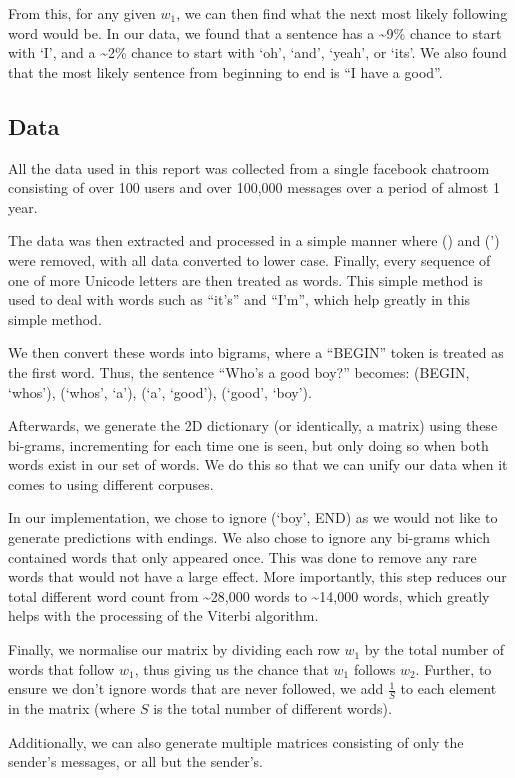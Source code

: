 \documentclass{article}
\begin{document}
From this, for any given $w_1$, we can then find what the next most likely
following word would be. In our data, we found that a sentence has a \sim9\%
chance to start with `I', and a \sim2\% chance to start with `oh', `and',
`yeah', or `its'. We also found that the most likely sentence from beginning to
end is ``I have a good''.

\subsection{Data}
All the data used in this report was collected from a single facebook chatroom
consisting of over 100 users and over 100,000 messages over a period of almost
1 year.

The data was then extracted and processed in a simple manner where
(\textsc{}) and (\textsc{'}) were removed, with all data converted to
lower case. Finally, every sequence of one of more Unicode letters are then
treated as words. This simple method is used to deal with words such as
``it's'' and ``I'm'', which help greatly in this simple method.

We then convert these words into bigrams, where a ``BEGIN'' token is treated as
the first word. Thus, the sentence ``Who's a good boy?'' becomes:
(BEGIN, `whos'), (`whos', `a'), (`a', `good'), (`good', `boy').

Afterwards, we generate the 2D dictionary (or identically, a matrix)
using these bi-grams, incrementing for each time one is seen, but only doing so
when both words exist in our set of words. We do this so that we can unify our
data when it comes to using different corpuses.

In our implementation, we chose to ignore (`boy', END) as we would not like to
generate predictions with endings. We also chose to ignore any bi-grams which
contained words that only appeared once. This was done to remove any rare words
that would not have a large effect. More importantly, this step reduces our
total different word count from \sim28,000 words to \sim 14,000 words, which
greatly helps with the processing of the Viterbi algorithm.

Finally, we normalise our matrix by dividing each row $w_1$ by the total number
of words that follow $w_1$, thus giving us the chance that $w_1$ follows $w_2$.
Further, to ensure we don't ignore words that are never followed, we add
$\frac{1}{S}$ to each element in the matrix (where $S$ is the total number of
different words).

Additionally, we can also generate multiple matrices consisting of only the
sender's messages, or all but the sender's.
\end{document}
